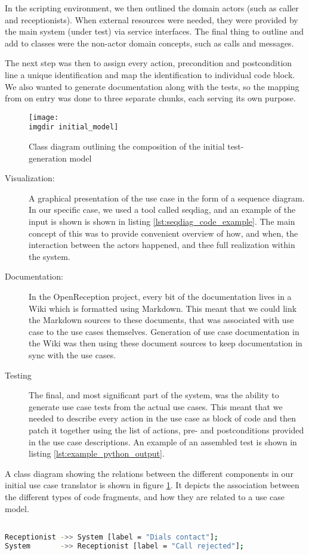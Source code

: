 \noindent In the scripting environment, we then outlined the domain actors (such as caller and receptionists). When external resources were needed, they were provided by the main system (under test) via service interfaces. The final thing to outline and add to classes were the non-actor domain concepts, such as calls and messages.\medskip

\noindent The next step was then to assign every action, precondition and postcondition line a unique identification and map the identification to individual code block. We also wanted to generate documentation along with the tests, so the mapping from on entry was done to three separate chunks, each serving its own purpose.
\begin{figure}[!htbp]
\centering
\texttt{[image: \\imgdir initial\_model]}
\caption{Class diagram outlining the composition of the initial test-generation model}
\label{fig:first_generation_model}
\end{figure}
\begin{description}
  \item[Visualization:] A graphical presentation of the use case in the form of a sequence diagram. In our specific case, we used a tool called seqdiag, and an example of the input is shown is shown in listing \ref{lst:seqdiag_code_example}. The main concept of this was to provide convenient overview of how, and when, the interaction between the actors happened, and thee full realization within the system.
  \item[Documentation:] In the OpenReception project, every bit of the documentation lives in a Wiki which is formatted using Markdown. This meant that we could link the Markdown sources to these documents, that was associated with use case to the use cases themselves. Generation of use case documentation in the Wiki was then using these document sources to keep documentation in sync with the use cases.
  \item[Testing] The final, and most significant part of the system, was the ability to generate use case tests from the actual use cases. This meant that we needed to describe every action in the use case as block of code and then patch it together using the list of actions, pre- and postconditions provided in the use case descriptions. An example of an assembled test is shown in listing \ref{lst:example_python_output}.
\end{description}
\noindent
A class diagram showing the relations between the different components in our initial use case translator is shown in figure \ref{fig:first_generation_model}. It depicts the association between the different types of code fragments, and how they are related to a use case model.
\begin{lstlisting}[language=Bash, caption=Example seqdiag input fragment, label=lst:seqdiag_code_example]

Receptionist ->> System [label = "Dials contact"];
System       ->> Receptionist [label = "Call rejected"];
\end{lstlisting}

